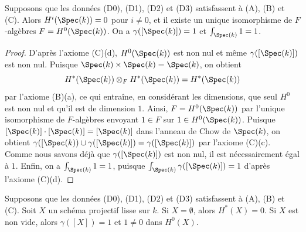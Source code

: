 \begin{lemma}
\label{lemma-base}
Supposons que les données (D0), (D1), (D2) et (D3) satisfassent à (A), (B) et (C).
Alors $H^i(\Spec(k)) = 0$ pour $i \not = 0$, et il existe un
unique isomorphisme de $F$-algèbres $F = H^0(\Spec(k))$.
On a $\gamma([\Spec(k)]) = 1$ et $\int_{\Spec(k)} 1 = 1$.
\end{lemma}

\begin{proof}
D'après l'axiome (C)(d), $H^0(\Spec(k))$ est non nul et même
$\gamma([\Spec(k)])$ est non nul.
Puisque $\Spec(k) \times \Spec(k) = \Spec(k)$, on obtient
$$
H^*(\Spec(k)) \otimes_F H^*(\Spec(k)) = H^*(\Spec(k))
$$
par l'axiome (B)(a), ce qui entraîne, en considérant les dimensions, que seul
$H^0$ est non nul et qu'il est de dimension $1$. Ainsi,
$F = H^0(\Spec(k))$ par l'unique isomorphisme de $F$-algèbres
envoyant $1 \in F$ sur $1 \in H^0(\Spec(k))$.
Puisque $[\Spec(k)] \cdot [\Spec(k)] = [\Spec(k)]$ dans
l'anneau de Chow de $\Spec(k)$, on obtient
$\gamma([\Spec(k)) \cup \gamma([\Spec(k)]) = \gamma([\Spec(k)])$
par l'axiome (C)(c). Comme nous savons déjà que $\gamma([\Spec(k)])$ est non nul,
il est nécessairement égal à $1$.
Enfin, on a $\int_{\Spec(k)} 1 = 1$, puisque
$\int_{\Spec(k)} \gamma([\Spec(k)]) = 1$
d'après l'axiome (C)(d).
\end{proof}

\begin{lemma}
\label{lemma-unit}
Supposons que les données (D0), (D1), (D2) et (D3) satisfassent à (A), (B) et (C).
Soit $X$ un schéma projectif lisse sur $k$.
Si $X = \emptyset$, alors $H^*(X) = 0$.
Si $X$ est non vide, alors $\gamma([X]) = 1$ et $1 \not = 0$ dans $H^0(X)$.
\end{lemma}

